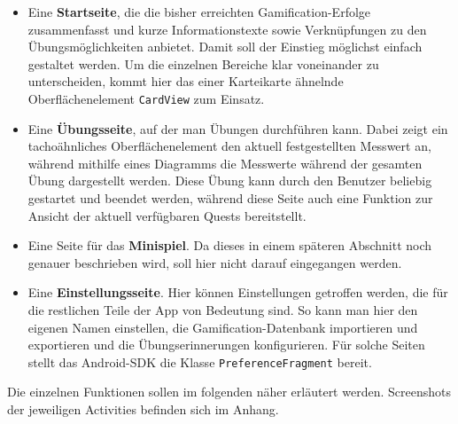 \begin{itemize}
	\item Eine \textbf{Startseite}, die die bisher erreichten Gamification-Erfolge zusammenfasst und kurze Informationstexte sowie Verknüpfungen zu den Übungsmöglichkeiten anbietet. Damit soll der Einstieg möglichst einfach gestaltet werden. Um die einzelnen Bereiche klar voneinander zu unterscheiden, kommt hier das einer Karteikarte ähnelnde Oberflächenelement \texttt{CardView} zum Einsatz.
	\item Eine \textbf{Übungsseite}, auf der man Übungen durchführen kann. Dabei zeigt ein tachoähnliches Oberflächenelement den aktuell festgestellten Messwert an, während mithilfe eines Diagramms die Messwerte während der gesamten Übung dargestellt werden. Diese Übung kann durch den Benutzer beliebig gestartet und beendet werden, während diese Seite auch eine Funktion zur Ansicht der aktuell verfügbaren Quests bereitstellt.
	\item Eine Seite für das \textbf{Minispiel}. Da dieses in einem späteren Abschnitt noch genauer beschrieben wird, soll hier nicht darauf eingegangen werden.
	\item Eine \textbf{Einstellungsseite}. Hier können Einstellungen getroffen werden, die für die restlichen Teile der App von Bedeutung sind. So kann man hier den eigenen Namen einstellen, die Gamification-Datenbank importieren und exportieren und die Übungserinnerungen konfigurieren. Für solche Seiten stellt das Android-SDK die Klasse \texttt{PreferenceFragment}\cite{Src:AndroidKuenneth} bereit.
\end{itemize}
Die einzelnen Funktionen sollen im folgenden näher erläutert werden. Screenshots der jeweiligen Activities befinden sich im Anhang.
\newpage
